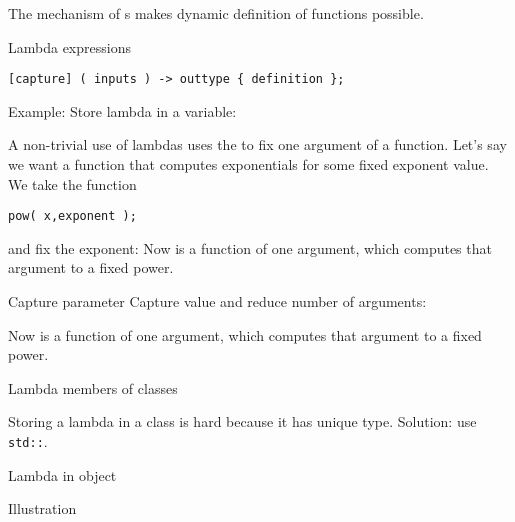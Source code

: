 
The mechanism of s makes
dynamic definition of functions possible.

\begin{block}{Lambda expressions}
  \label{sl:lambda-syntax}
\begin{verbatim}
[capture] ( inputs ) -> outtype { definition };
\end{verbatim}
Example:
Store lambda in a variable:
\end{block}

A non-trivial use of lambdas uses the  to fix one argument of a
function.
Let's say we want a function that computes exponentials for some fixed
exponent value. We take the 
 function
\begin{verbatim}
pow( x,exponent );
\end{verbatim}
and fix the exponent:
%
%
Now  is a function of one argument, which computes
that argument to a fixed power.

\begin{slide}{Capture parameter}
  \label{sl:lambda-capture}
  Capture value and reduce number of arguments:

  Now  is a function of one argument, which computes
  that argument to a fixed power.
\end{slide}

 {Lambda members of classes}

Storing a lambda in a class is hard because it has unique
type. Solution: use \lstinline{std::}.

\begin{block}{Lambda in object}
  \label{sl:lambda-class}
\end{block}

\begin{block}{Illustration}
  \label{sl:lambda-classed}
\end{block}

